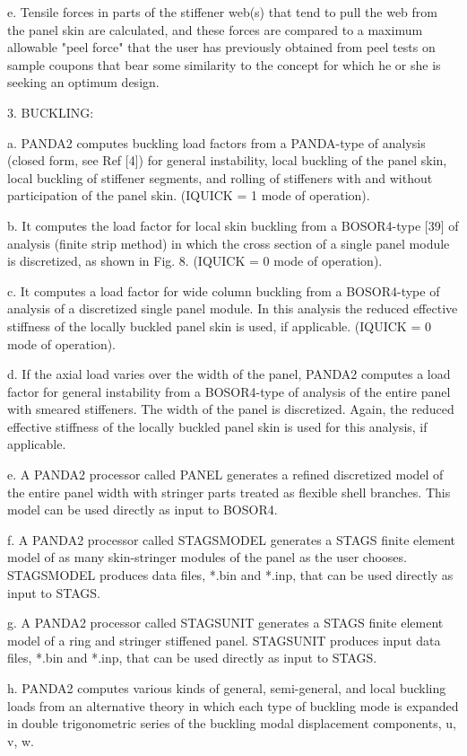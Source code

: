 e. Tensile forces in parts of the stiffener web(s) that tend to pull the
web from the panel skin are calculated, and these forces are compared to a
maximum allowable "peel force" that the user has previously obtained from
peel tests on sample coupons that bear some similarity to the concept for
which he or she is seeking an optimum design. 


3. BUCKLING:

a. PANDA2 computes buckling load factors from a PANDA-type of analysis
(closed form, see Ref [4]) for general instability, local buckling of the
panel skin, local buckling of stiffener segments, and rolling of
stiffeners with and without participation of the panel skin. (IQUICK = 1
mode of operation). 

b. It computes the load factor for local skin buckling from a BOSOR4-type
[39] of analysis (finite strip method) in which the cross section of a
single panel module is discretized, as shown in Fig. 8. (IQUICK = 0 mode
of operation). 

c. It computes a load factor for wide column buckling from a BOSOR4-type
of analysis of a discretized single panel module. In this analysis the
reduced effective stiffness of the locally buckled panel skin is used, if
applicable. (IQUICK = 0 mode of operation). 

d. If the axial load varies over the width of the panel, PANDA2 computes a
load factor for general instability from a BOSOR4-type of analysis of the
entire panel with smeared stiffeners. The width of the panel is
discretized. Again, the reduced effective stiffness of the locally buckled
panel skin is used for this analysis, if applicable. 

e. A PANDA2 processor called PANEL generates a refined discretized model
of the entire panel width with stringer parts treated as flexible shell
branches. This model can be used directly as input to BOSOR4.

f. A PANDA2 processor called STAGSMODEL generates a STAGS finite element
model of as many skin-stringer modules of the panel as the user chooses.
STAGSMODEL produces data files, *.bin and *.inp, that can be used
directly as input to STAGS.

g. A PANDA2 processor called STAGSUNIT generates a STAGS finite element
model of a ring and stringer stiffened panel. STAGSUNIT produces input
data files, *.bin and *.inp, that can be used directly as input to STAGS.

h. PANDA2 computes various kinds of general, semi-general, and local
buckling loads from an alternative theory in which each type of buckling mode
is expanded in double trigonometric series of the buckling modal displacement
components, u, v, w.


